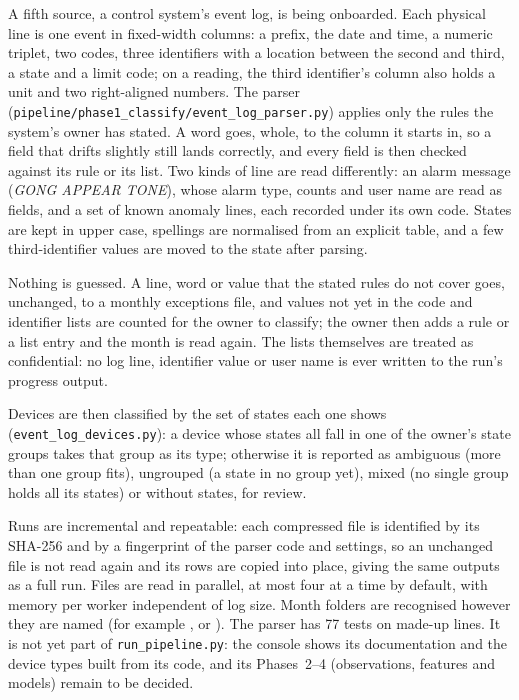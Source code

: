 \documentclass[11pt,a4paper]{article}
\newcommand{\tok}[1]{\texttt{\detokenize{#1}}}
\begin{document}
A fifth source, a control system's event log, is being onboarded. Each physical line is one event in fixed-width columns: a prefix, the date and time, a numeric triplet, two codes, three identifiers with a location between the second and third, a state and a limit code; on a reading, the third identifier's column also holds a unit and two right-aligned numbers. The parser (\nolinkurl{pipeline/phase1_classify/event_log_parser.py}) applies only the rules the system's owner has stated. A word goes, whole, to the column it starts in, so a field that drifts slightly still lands correctly, and every field is then checked against its rule or its list. Two kinds of line are read differently: an alarm message (\emph{GONG APPEAR TONE}), whose alarm type, counts and user name are read as fields, and a set of known anomaly lines, each recorded under its own code. States are kept in upper case, spellings are normalised from an explicit table, and a few third-identifier values are moved to the state after parsing.

Nothing is guessed. A line, word or value that the stated rules do not cover goes, unchanged, to a monthly exceptions file, and values not yet in the code and identifier lists are counted for the owner to classify; the owner then adds a rule or a list entry and the month is read again. The lists themselves are treated as confidential: no log line, identifier value or user name is ever written to the run's progress output.

Devices are then classified by the set of states each one shows (\nolinkurl{event_log_devices.py}): a device whose states all fall in one of the owner's state groups takes that group as its type; otherwise it is reported as ambiguous (more than one group fits), ungrouped (a state in no group yet), mixed (no single group holds all its states) or without states, for review.

Runs are incremental and repeatable: each compressed file is identified by its SHA-256 and by a fingerprint of the parser code and settings, so an unchanged file is not read again and its rows are copied into place, giving the same outputs as a full run. Files are read in parallel, at most four at a time by default, with memory per worker independent of log size. Month folders are recognised however they are named (for example \tok{Dec 25}, \tok{Sept-25} or \tok{2025-09}). The parser has 77 tests on made-up lines. It is not yet part of \nolinkurl{run_pipeline.py}: the console shows its documentation and the device types built from its code, and its Phases~2--4 (observations, features and models) remain to be decided.
\end{document}
